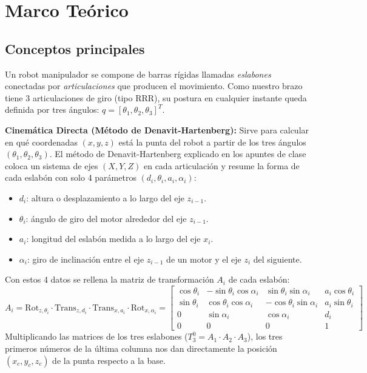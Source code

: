 \documentclass[11pt,a4paper]{article}
\begin{document}
\section{Marco Teórico}

\subsection{Conceptos principales}
Un robot manipulador se compone de barras rígidas llamadas \textit{eslabones} conectadas por \textit{articulaciones} que producen el movimiento. Como nuestro brazo tiene 3 articulaciones de giro (tipo RRR), su postura en cualquier instante queda definida por tres ángulos: $q = [\theta_1, \theta_2, \theta_3]^T$.

\textbf{Cinemática Directa (Método de Denavit-Hartenberg):}
Sirve para calcular en qué coordenadas $(x, y, z)$ está la punta del robot a partir de los tres ángulos $(\theta_1, \theta_2, \theta_3)$. El método de Denavit-Hartenberg explicado en los apuntes de clase coloca un sistema de ejes $(X, Y, Z)$ en cada articulación y resume la forma de cada eslabón con solo 4 parámetros $(d_i, \theta_i, a_i, \alpha_i)$:
\begin{itemize}
    \item $d_i$: altura o desplazamiento a lo largo del eje $z_{i-1}$.
    \item $\theta_i$: ángulo de giro del motor alrededor del eje $z_{i-1}$.
    \item $a_i$: longitud del eslabón medida a lo largo del eje $x_i$.
    \item $\alpha_i$: giro de inclinación entre el eje $z_{i-1}$ de un motor y el eje $z_i$ del siguiente.
\end{itemize}

Con estos 4 datos se rellena la matriz de transformación $A_i$ de cada eslabón:
\begin{equation}
    A_i = \text{Rot}_{z,\theta_i} \cdot \text{Trans}_{z,d_i} \cdot \text{Trans}_{x,a_i} \cdot \text{Rot}_{x,\alpha_i} =
    \begin{bmatrix}
        \cos\theta_i & -\sin\theta_i\cos\alpha_i & \sin\theta_i\sin\alpha_i & a_i\cos\theta_i \\
        \sin\theta_i & \cos\theta_i\cos\alpha_i & -\cos\theta_i\sin\alpha_i & a_i\sin\theta_i \\
        0 & \sin\alpha_i & \cos\alpha_i & d_i \\
        0 & 0 & 0 & 1
    \end{bmatrix}
    \label{eq:dh_general}
\end{equation}
Multiplicando las matrices de los tres eslabones ($T_3^0 = A_1 \cdot A_2 \cdot A_3$), los tres primeros números de la última columna nos dan directamente la posición $(x_c, y_c, z_c)$ de la punta respecto a la base.
\end{document}
